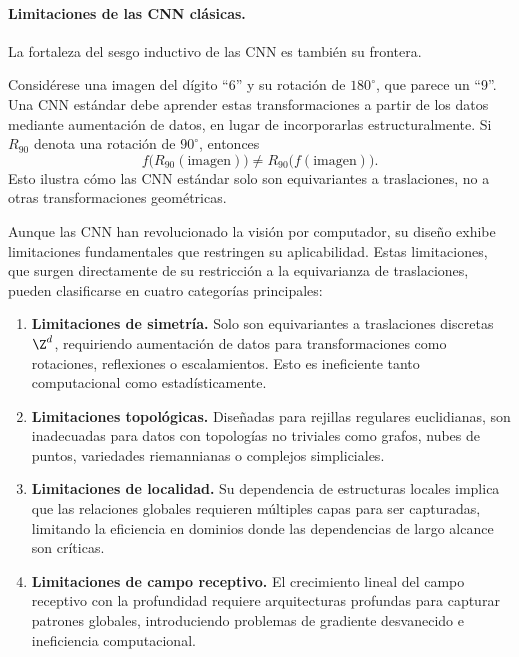 \paragraph{Limitaciones de las CNN cl\'asicas.}
La fortaleza del sesgo inductivo de las CNN es tambi\'en su frontera.

\begin{example}
\label{ex:grids:no-rotation}
Consid\'erese una imagen del d\'igito ``6'' y su rotaci\'on de $180^\circ$, que
parece un ``9''. Una CNN est\'andar debe aprender estas transformaciones a
partir de los datos mediante aumentaci\'on de datos, en lugar de incorporarlas
estructuralmente. Si $R_{90}$ denota una rotaci\'on de $90^\circ$, entonces
\[
  f\big(R_{90}(\text{imagen})\big) \neq R_{90}\big(f(\text{imagen})\big).
\]
Esto ilustra c\'omo las CNN est\'andar solo son equivariantes a traslaciones, no
a otras transformaciones geom\'etricas.
\end{example}

Aunque las CNN han revolucionado la visi\'on por computador, su dise\~no exhibe
limitaciones fundamentales que restringen su aplicabilidad. Estas limitaciones,
que surgen directamente de su restricci\'on a la equivarianza de traslaciones,
pueden clasificarse en cuatro categor\'ias principales:
\begin{enumerate}
  \item \textbf{Limitaciones de simetr\'ia.} Solo son equivariantes a
    traslaciones discretas $\Z^d$, requiriendo aumentaci\'on de datos para
    transformaciones como rotaciones, reflexiones o escalamientos. Esto es
    ineficiente tanto computacional como estad\'isticamente.
  \item \textbf{Limitaciones topol\'ogicas.} Dise\~nadas para rejillas regulares
    euclidianas, son inadecuadas para datos con topolog\'ias no triviales como
    grafos, nubes de puntos, variedades riemannianas o complejos simpliciales.
  \item \textbf{Limitaciones de localidad.} Su dependencia de estructuras
    locales implica que las relaciones globales requieren m\'ultiples capas para
    ser capturadas, limitando la eficiencia en dominios donde las dependencias
    de largo alcance son cr\'iticas.
  \item \textbf{Limitaciones de campo receptivo.} El crecimiento lineal del
    campo receptivo con la profundidad requiere arquitecturas profundas para
    capturar patrones globales, introduciendo problemas de gradiente
    desvanecido e ineficiencia computacional.
\end{enumerate}


